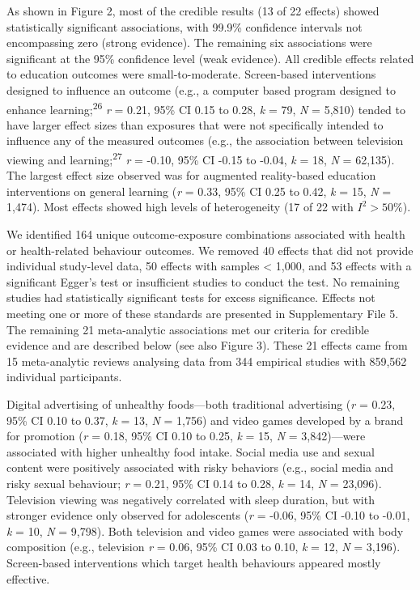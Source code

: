\documentclass[
  english,
  man]{apa6}
\begin{document}
As shown in Figure 2, most of the credible results (13 of 22 effects) showed statistically significant associations, with 99.9\% confidence intervals not encompassing zero (strong evidence).
The remaining six associations were significant at the 95\% confidence level (weak evidence).
All credible effects related to education outcomes were small-to-moderate.
Screen-based interventions designed to influence an outcome (e.g., a computer based program designed to enhance learning;\textsuperscript{26} \emph{r} = 0.21, 95\% CI 0.15 to 0.28, \emph{k} = 79, \emph{N} = 5,810) tended to have larger effect sizes than exposures that were not specifically intended to influence any of the measured outcomes (e.g., the association between television viewing and learning;\textsuperscript{27} \emph{r} = -0.10, 95\% CI -0.15 to -0.04, \emph{k} = 18, \emph{N} = 62,135).
The largest effect size observed was for augmented reality-based education interventions on general learning (\emph{r} = 0.33, 95\% CI 0.25 to 0.42, \emph{k} = 15, \emph{N} = 1,474).
Most effects showed high levels of heterogeneity (17 of 22 with \(I^2 > 50\%\)).

We identified 164 unique outcome-exposure combinations associated with health or health-related behaviour outcomes.
We removed 40 effects that did not provide individual study-level data, 50 effects with samples \textless{} 1,000, and 53 effects with a significant Egger's test or insufficient studies to conduct the test.
No remaining studies had statistically significant tests for excess significance.
Effects not meeting one or more of these standards are presented in Supplementary File 5.
The remaining 21 meta-analytic associations met our criteria for credible evidence and are described below (see also Figure 3).
These 21 effects came from 15 meta-analytic reviews analysing data from 344 empirical studies with 859,562 individual participants.

Digital advertising of unhealthy foods---both traditional advertising (\emph{r} = 0.23, 95\% CI 0.10 to 0.37, \emph{k} = 13, \emph{N} = 1,756) and video games developed by a brand for promotion (\emph{r} = 0.18, 95\% CI 0.10 to 0.25, \emph{k} = 15, \emph{N} = 3,842)---were associated with higher unhealthy food intake.
Social media use and sexual content were positively associated with risky behaviors (e.g., social media and risky sexual behaviour; \emph{r} = 0.21, 95\% CI 0.14 to 0.28, \emph{k} = 14, \emph{N} = 23,096).
Television viewing was negatively correlated with sleep duration, but with stronger evidence only observed for adolescents (\emph{r} = -0.06, 95\% CI -0.10 to -0.01, \emph{k} = 10, \emph{N} = 9,798).
Both television and video games were associated with body composition (e.g., television \emph{r} = 0.06, 95\% CI 0.03 to 0.10, \emph{k} = 12, \emph{N} = 3,196).
Screen-based interventions which target health behaviours appeared mostly effective.
\end{document}
